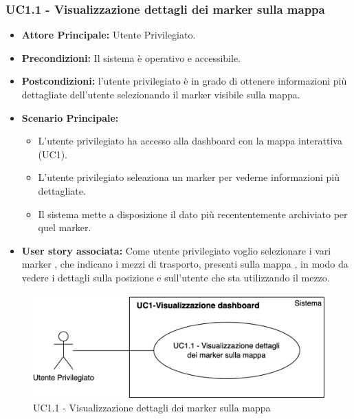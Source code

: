 \documentclass[11pt]{article}
\begin{document}
\begin{justify}
\subsubsection{\textbf{UC1.1 - Visualizzazione dettagli dei marker sulla mappa }}
\begin{itemize}
     \item \textbf{Attore Principale:} Utente Privilegiato.
     \item \textbf{Precondizioni:} Il sistema è operativo e accessibile.
     \item \textbf{Postcondizioni:} l'utente privilegiato è in grado di ottenere informazioni più dettagliate dell'utente selezionando il marker visibile sulla mappa.
     \item \textbf{Scenario Principale:}
     \begin{itemize}
         \item L'utente privilegiato ha accesso alla dashboard con la mappa interattiva (UC1).
         \item L'utente privilegiato seleaziona un marker per vederne informazioni più dettagliate.
         \item Il sistema mette a disposizione il dato più recententemente archiviato per quel marker.
     \end{itemize}
     \item \textbf{User story associata:}
     Come utente privilegiato voglio selezionare i vari marker , che indicano i mezzi di trasporto, presenti sulla mappa , in modo da vedere i dettagli sulla posizione e sull'utente che sta utilizzando il mezzo.
\end{itemize}
\begin{figure}[ht]
    \centering
    \includegraphics[width=0.5\linewidth]{UC1.1image.png}
    \caption{UC1.1 - Visualizzazione dettagli dei marker sulla mappa}
    \label{fig:UC1.1}
\end{figure}


\end{justify}
\end{document}
